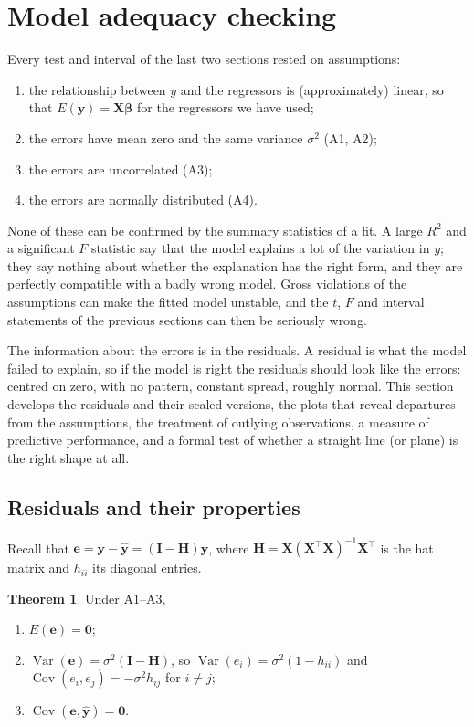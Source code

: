 \documentclass[11pt,a4paper]{article}
\numberwithin{equation}{section}
\theoremstyle{definition}
\newtheorem{thm}{Theorem}[subsection]
\begin{document}
\section{Model adequacy checking}
Every test and interval of the last two sections rested on assumptions:
\begin{enumerate}[label=(\roman*)]
\item the relationship between $y$ and the regressors is (approximately) linear, so that
$E(\mathbf{y}) = \mathbf{X}\boldsymbol\beta$ for the regressors we have used;
\item the errors have mean zero and the same variance $\sigma^2$ (A1, A2);
\item the errors are uncorrelated (A3);
\item the errors are normally distributed (A4).
\end{enumerate}
None of these can be confirmed by the summary statistics of a fit. A large $R^2$ and a
significant $F$ statistic say that the model explains a lot of the variation in $y$; they
say nothing about whether the explanation has the right form, and they are perfectly
compatible with a badly wrong model. Gross violations of the assumptions can make the
fitted model unstable, and the $t$, $F$ and interval statements of the previous sections
can then be seriously wrong.

The information about the errors is in the residuals. A residual is what the model failed
to explain, so if the model is right the residuals should look like the errors: centred on
zero, with no pattern, constant spread, roughly normal. This section develops the
residuals and their scaled versions, the plots that reveal departures from the
assumptions, the treatment of outlying observations, a measure of predictive performance,
and a formal test of whether a straight line (or plane) is the right shape at all.

\subsection{Residuals and their properties}
Recall that $\mathbf{e} = \mathbf{y} - \hat{\mathbf{y}} = (\mathbf{I} - \mathbf{H})\mathbf{y}$,
where $\mathbf{H} = \mathbf{X}(\mathbf{X}^\top\mathbf{X})^{-1}\mathbf{X}^\top$ is the hat
matrix and $h_{ii}$ its diagonal entries.

\begin{thm}\label{thm:resid-var}
Under A1--A3,
\begin{enumerate}[label=(\roman*)]
\item $E(\mathbf{e}) = \mathbf{0}$;
\item $\operatorname{Var}(\mathbf{e}) = \sigma^2(\mathbf{I} - \mathbf{H})$, so
$\operatorname{Var}(e_i) = \sigma^2(1 - h_{ii})$ and
$\operatorname{Cov}(e_i, e_j) = -\sigma^2 h_{ij}$ for $i \neq j$;
\item $\operatorname{Cov}(\mathbf{e}, \hat{\mathbf{y}}) = \mathbf{0}$.
\end{enumerate}
\end{thm}
\end{document}
